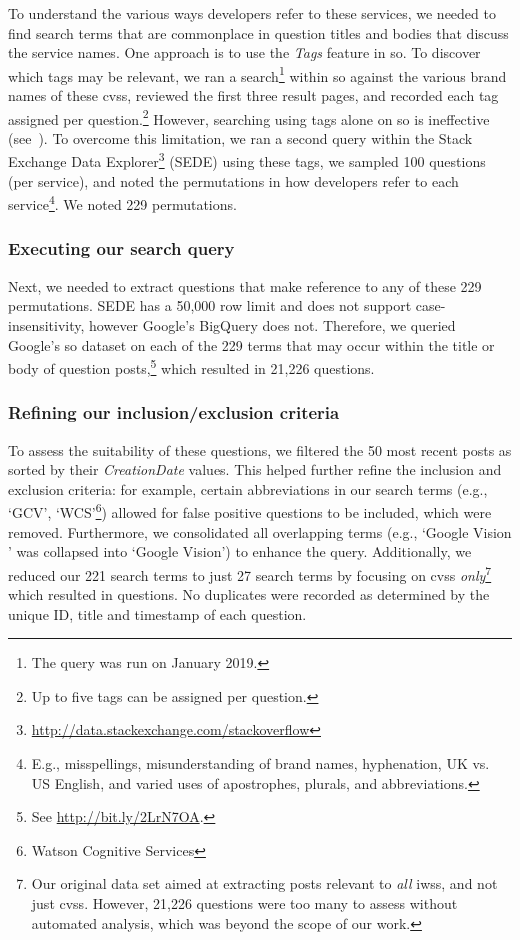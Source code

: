To understand the various ways developers refer to these services, we needed to find search terms that are commonplace in question titles and bodies that discuss the service names. One approach is to use the \textit{Tags} feature in \gls{so}. To discover which tags may be relevant, we ran a search\footnote{The query was run on January 2019.} within \gls{so} against the various brand names of these \glspl{cvs}, reviewed the first three result pages, and recorded each tag assigned per question.\footnote{Up to five tags can be assigned per question.} However, searching using tags alone on \gls{so} is ineffective (see~\citep{Tahir:2018ks,Barua:2012gz}).
To overcome this limitation, we ran a second query within the Stack Exchange Data Explorer\footnote{\url{http://data.stackexchange.com/stackoverflow}} (SEDE) using these tags, we sampled 100 questions (per service), and noted the permutations in how developers refer to each service\footnote{E.g., misspellings, misunderstanding of brand names, hyphenation, UK vs. US English, and varied uses of apostrophes, plurals, and abbreviations.}. We noted 229 permutations.

\subsubsection{Executing our search query}

Next, we needed to extract questions that make reference to any of these 229 permutations. SEDE has a 50,000 row limit and does not support case-insensitivity, however Google's BigQuery does not. Therefore, we queried Google's \gls{so} dataset on each of the 229 terms that may occur within the title or body of question posts,\footnote{See \url{http://bit.ly/2LrN7OA}.} which resulted in 21,226 questions.

\subsubsection{Refining our inclusion/exclusion criteria}
\label{semotion2020:ssec:method:filtering:refining}

To assess the suitability of these questions, we filtered the 50 most recent posts as sorted by their \textit{CreationDate} values. This helped further refine the inclusion and exclusion criteria: for example, certain abbreviations in our search terms (e.g., `GCV', `WCS'\footnote{Watson Cognitive Services}) allowed for false positive questions to be included, which were removed. Furthermore, we consolidated all overlapping terms (e.g., `Google Vision \uline{\textbf{}}' was collapsed into `Google Vision') to enhance the query. Additionally, we reduced our 221 search terms to just 27 search terms by focusing on \glspl{cvs} \textit{only}\footnote{Our original data set aimed at extracting posts relevant to \textit{all} \glspl{iws}, and not just \glspl{cvs}. However, 21,226 questions were too many to assess without automated analysis, which was beyond the scope of our work.} which resulted in \SEMNumPostsFromSO{} questions. No duplicates were recorded as determined by the unique ID, title and timestamp of each question.

